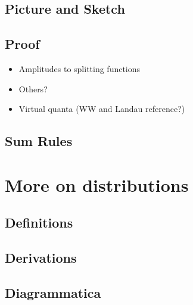 \begin{subappendices}
\subsection{Picture and Sketch}

\subsection{Proof}


\begin{itemize}
    \item
        Amplitudes to splitting functions

    \item
        Others?

    \item
        Virtual quanta (WW and Landau reference?)
\end{itemize}

\subsection{Sum Rules}


\section{More on distributions}

\subsection{Definitions}


\subsection{Derivations}

\subsection{Diagrammatica}


\end{subappendices}

